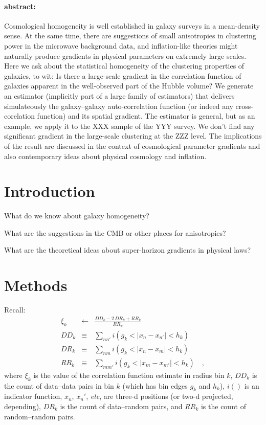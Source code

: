 \documentclass[12pt, letterpaper]{article}
\newcommand{\foreign}[1]{\textsl{#1}}
\newcommand{\etc}{\foreign{etc}}
\begin{document}
\paragraph{abstract:}
Cosmological homogeneity is well established in galaxy surveys in a mean-density
sense.
At the same time, there are suggestions of small anisotropies in clustering power in
the microwave background data, and inflation-like theories might naturally produce
gradients in physical parameters on extremely large scales.
Here we ask about the statistical homogeneity of the clustering properties of galaxies,
to wit:
Is there a large-scale gradient in the correlation function of galaxies
apparent in the well-observed part of the Hubble volume?
We generate an estimator (implicitly part of a large family of estimators)
that delivers simulateously the galaxy--galaxy auto-correlation function
(or indeed any cross-corelation function)
and its spatial gradient.
The estimator is general, but as an example,
we apply it to the XXX sample of the YYY survey.
We don't find any significant gradient in the large-scale clustering at the ZZZ level.
The implications of the result are discussed in the context of cosmological parameter
gradients and also contemporary ideas about physical cosmology and inflation.

\section{Introduction}

What do we know about galaxy homogeneity?

What are the suggestions in the CMB or other places for anisotropies?

What are the theoretical ideas about super-horizon gradients in physical laws?

\section{Methods}

Recall:
\begin{eqnarray}\displaystyle
\xi_k &\leftarrow& \frac{DD_k - 2\,DR_k + RR_k}{RR_k}
\\
DD_k &\equiv& \sum_{n n'} i(g_k < |x_n - x_{n'}| < h_k)
\\
DR_k &\equiv& \sum_{n m} i(g_k < |x_n - x_m| < h_k)
\\
RR_k &\equiv& \sum_{m m'} i(g_k < |x_m - x_{m'}| < h_k)
\quad ,
\end{eqnarray}
where
$\xi_k$ is the value of the correlation function estimate in radius bin $k$,
$DD_k$ is the count of data--data pairs in bin $k$
(which has bin edges $g_k$ and $h_k$),
$i()$ is an indicator function,
$x_n$, $x_n'$, \etc, are three-d positions (or two-d projected, depending),
$DR_k$ is the count of data--random pairs,
and
$RR_k$ is the count of random--random pairs.
\end{document}
